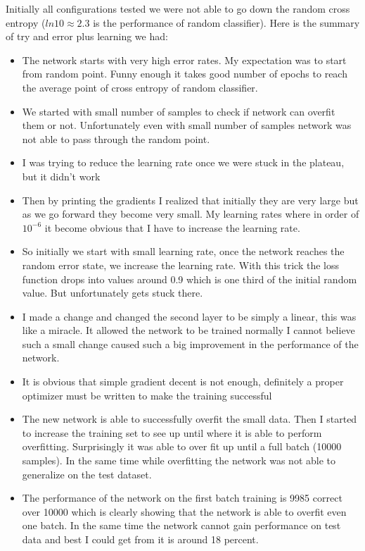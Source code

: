 Initially all configurations tested we were not able to go down the random cross entropy ($ln 10 \approx 2.3 $  is the performance of random classifier).  Here is the summary of try and error plus learning we had: 

\begin{itemize}
    \item The network starts with very high error rates. My expectation was to start from random point. Funny enough it takes good number of epochs to reach the average point of cross entropy of random classifier. 
    \item We started with small number of samples to check if network can overfit them or not. Unfortunately even with small number of samples network was not able to pass through the random point. 
    \item I was trying to reduce the  learning rate once we were stuck in the plateau, but it didn't work 
    \item Then by printing the gradients I realized that initially they are very large but as we go forward they become very small. My learning rates where in order of $10^{-6}$  it become obvious that I have to increase the learning rate. 
    \item So initially we start with small learning rate, once the network reaches the random error state, we increase the learning rate.  With this trick the loss function drops into values  around 0.9 which is one third of the initial random value. But unfortunately gets stuck there. 
    \item  I made a change and changed the second layer to be simply a linear, this was like a miracle. It allowed the network to be trained normally I cannot believe such a small change caused such a big improvement in the performance of the network. 
    \item It is obvious that simple gradient decent is not enough, definitely a proper optimizer must be written to make the training successful 
    \item The new network is able to successfully overfit the small data. Then I started to increase the training set to see up until where it is able to perform overfitting. Surprisingly it was able to over fit up until a full batch (10000 samples). In the same time while overfitting the network was not able to generalize on the test dataset. 
    \item  The performance of the network on the first batch training is 9985 correct over 10000 which is clearly showing that the network is able to overfit even one batch. In the same time the network cannot gain performance on test data and best I could get from it is around 18 percent. 
    
\end{itemize}

